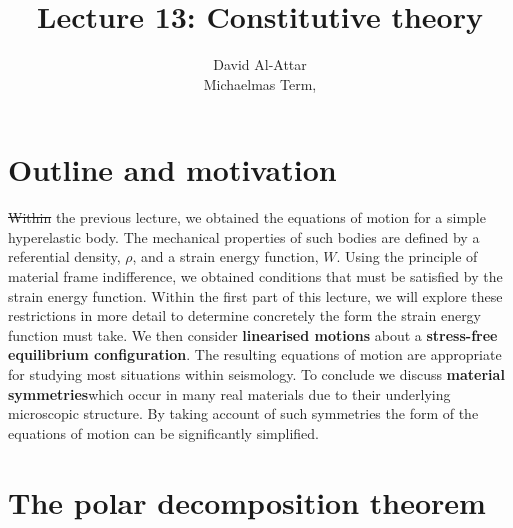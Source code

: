 \documentclass [a4paper,12pt]{paper}
\providecommand{\DIFadd}[1]{{\protect\color{blue}\uwave{#1}}} %
\providecommand{\DIFdel}[1]{{\protect\color{red}\sout{#1}}}                      %
\providecommand{\DIFaddbegin}{} %
\providecommand{\DIFaddend}{} %
\providecommand{\DIFdelbegin}{} %
\providecommand{\DIFdelend}{} %
\begin{document}
\title{Lecture 13: Constitutive theory}
\author{David Al-Attar \\ Michaelmas Term, \the\year}



\maketitle
\DIFdelbegin %

\DIFdelend \section*{Outline and motivation}

\DIFdelbegin \DIFdel{Within }\DIFdelend \DIFaddbegin \DIFadd{In }\DIFaddend the previous lecture, we obtained the equations of motion for a simple hyperelastic body. The mechanical properties
of such bodies are defined by a referential density, $\rho$, and a strain energy function, $W$. Using the principle of material 
frame indifference, we obtained conditions that must be satisfied by the strain energy function. Within the first part of this lecture, 
we will explore these restrictions in more detail to determine concretely the form the strain energy function must take. We then consider 
\textbf{linearised motions} about a \textbf{stress-free equilibrium configuration}. The resulting equations of motion are appropriate for studying most 
situations within seismology. To conclude we discuss \textbf{material symmetries}\DIFaddbegin \DIFadd{, }\DIFaddend which occur in many real materials due to their underlying 
microscopic structure. By taking account of such symmetries the form of the equations of motion can be significantly simplified.

\section*{The polar decomposition theorem}
\end{document}
